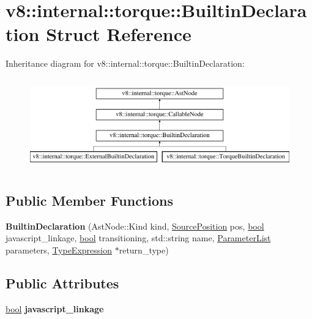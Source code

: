 \hypertarget{structv8_1_1internal_1_1torque_1_1BuiltinDeclaration}{}\section{v8\+:\+:internal\+:\+:torque\+:\+:Builtin\+Declaration Struct Reference}
\label{structv8_1_1internal_1_1torque_1_1BuiltinDeclaration}
Inheritance diagram for v8\+:\+:internal\+:\+:torque\+:\+:Builtin\+Declaration\+:\begin{figure}[H]
\begin{center}
\leavevmode
\includegraphics[height=4.000000cm]{structv8_1_1internal_1_1torque_1_1BuiltinDeclaration}
\end{center}
\end{figure}
\subsection*{Public Member Functions}
\begin{DoxyCompactItemize}
\item 
\mbox{\label{structv8_1_1internal_1_1torque_1_1BuiltinDeclaration_ab9867797071cd78de1584f9a091eafdd}} 
{\bfseries Builtin\+Declaration} (Ast\+Node\+::\+Kind kind, \mbox{\hyperlink{structv8_1_1internal_1_1torque_1_1SourcePosition}{Source\+Position}} pos, \mbox{\hyperlink{classbool}{bool}} javascript\+\_\+linkage, \mbox{\hyperlink{classbool}{bool}} transitioning, std\+::string name, \mbox{\hyperlink{structv8_1_1internal_1_1torque_1_1ParameterList}{Parameter\+List}} parameters, \mbox{\hyperlink{structv8_1_1internal_1_1torque_1_1TypeExpression}{Type\+Expression}} $\ast$return\+\_\+type)
\end{DoxyCompactItemize}
\subsection*{Public Attributes}
\begin{DoxyCompactItemize}
\item 
\mbox{\label{structv8_1_1internal_1_1torque_1_1BuiltinDeclaration_a36f3c547a210a3355a4ab85d344ed4df}} 
\mbox{\hyperlink{classbool}{bool}} {\bfseries javascript\+\_\+linkage}
\end{DoxyCompactItemize}
